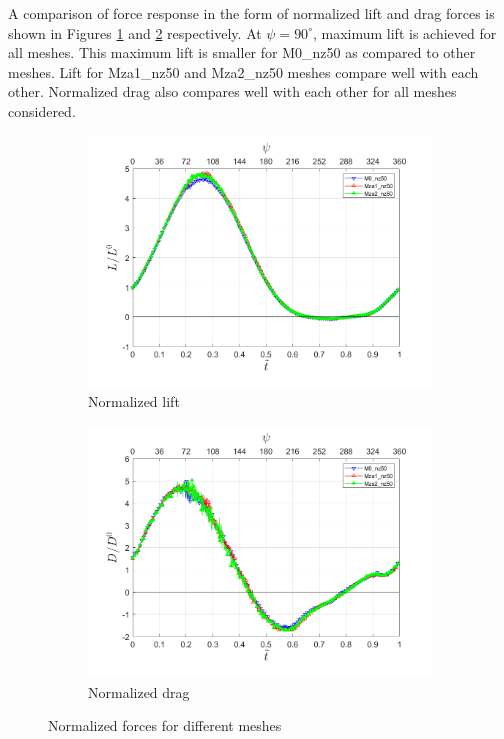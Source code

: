 
A comparison of force response in the form of normalized lift and drag forces is shown in Figures \ref{fig:lift_zonal_adapt_Re200k} and \ref{fig:drag_zonal_adapt_Re200k} respectively. 
At $\psi=90^\circ$, maximum lift is achieved for all meshes.
This maximum lift is smaller for M0\_nz50 as compared to other meshes. 
Lift for Mza1\_nz50 and Mza2\_nz50 meshes compare well with each other.
Normalized drag also compares well with each other for all meshes considered.



\begin{figure}[H]
	\centering
	
	\begin{subfigure}[b]{0.7\textwidth}
		\centering
		\includegraphics[width=1\textwidth]{figures/zonal_adapt_results/force_response_Re200k/Lift_inst.png}
		\caption{Normalized lift}
		\label{fig:lift_zonal_adapt_Re200k}
	\end{subfigure}
	\begin{subfigure}[b]{0.7\textwidth}
		\centering
		\includegraphics[width=1\textwidth]{figures/zonal_adapt_results/force_response_Re200k/Drag_inst.png}
		\caption{Normalized drag}
		\label{fig:drag_zonal_adapt_Re200k}
	\end{subfigure}
	
	\label{fig:force_response_zonal_adapt_Re200k}
	\caption{Normalized forces for different meshes}
\end{figure}